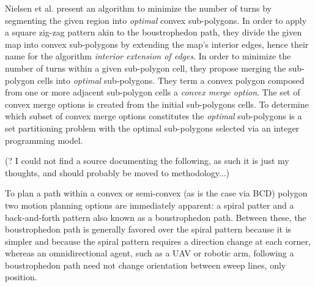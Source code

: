 Nielsen et al. present an algorithm to minimize the number of turns by segmenting the given region into \textit{optimal} convex sub-polygons\cite{IntEdgeExt}.
In order to apply a square zig-zag pattern akin to the boustrophedon path, they divide the given map into convex sub-polygons by extending the map's interior edges, hence their name for the algorithm \textit{interior extension of edges}.
In order to minimize the number of turns within a given sub-polygon cell, they propose merging the sub-polygon cells into \textit{optimal} sub-polygons.
They term a convex polygon composed from one or more adjacent sub-polygon cells a \textit{convex merge option}.
The set of convex merge options is created from the initial sub-polygons cells.
To determine which subset of convex merge options constitutes the \textit{optimal} sub-polygons is a set partitioning problem with the optimal sub-polygons selected via an integer programming model.

(? I could not find a source documenting the following, as such it is just my thoughts, and should probably be moved to methodology...)

To plan a path within a convex or semi-convex (as is the case via BCD) polygon two motion planning options are immediately apparent: a spiral patter and a back-and-forth pattern also known as a boustrophedon path.
Between these, the boustrophedon path is generally favored over the spiral pattern because it is simpler and because the spiral pattern requires a direction change at each corner, whereas an omnidirectional agent, such as a UAV or robotic arm, following a boustrophedon path need not change orientation between sweep lines, only position.

